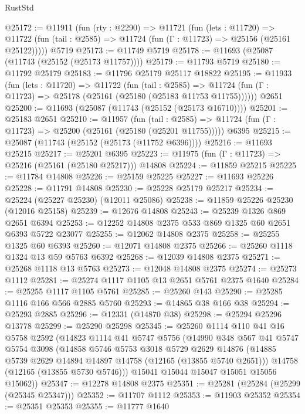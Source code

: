 \begin{lexlean}{RustStd}
\begin{coremodule}
@25172 := @11911
    (fun (rty : @2290) =>
    @11721
      (fun (lets : @11720) =>
      @11722 (fun (tail : @2585) => @11724 (fun (Γ : @11723) => @25156 (@25161 @25122)))))
    @5719
@25173 := @11749 @5719
@25178 := @11693 (@25087 (@11743 (@25152 (@25173 @11757))))
@25179 := @11793 @5719
@25180 := @11792 @25179
@25183 := @11796 @25179 @25117 @18822
@25195 := @11933
    (fun (lets : @11720) =>
    @11722
      (fun (tail : @2585) =>
      @11724 (fun (Γ : @11723) => @25178 (@25161 (@25180 (@25183 @11753 @11755))))))
    @2651
@25200 := @11693 (@25087 (@11743 (@25152 (@25173 @16710))))
@25201 := @25183 @2651
@25210 := @11957
    (fun (tail : @2585) => @11724 (fun (Γ : @11723) => @25200 (@25161 (@25180 (@25201 @11755)))))
    @6395
@25215 := @25087 (@11743 (@25152 (@25173 (@11752 @6396))))
@25216 := @11693 @25215
@25217 := @25201 @6395
@25223 := @11975 (fun (Γ : @11723) => @25216 (@25161 (@25180 @25217))) @14808
@25224 := @11859 @25215
@25225 := @11784 @14808
@25226 := @25159 @25225
@25227 := @11693 @25226
@25228 := @11791 @14808
@25230 := @25228 @25179 @25217
@25234 := @25224 (@25227 @25230) (@12011 @25086)
@25238 := @11859 @25226 @25230 (@12016 @25158)
@25239 := @12676 @14808
@25243 := @25239 @1326 @869 @2651 @6394
@25253 := @12252 @14808 @2375 @533 @869 @1325 @60 @2651 @6393 @5722 @23077
@25255 := @12062 @14808 @2375
@25258 := @25255 @1325 @60 @6393
@25260 := @12071 @14808 @2375
@25266 := @25260 @1118 @1324 @13 @59 @5763 @6392
@25268 := @12039 @14808 @2375
@25271 := @25268 @1118 @13 @5763
@25273 := @12048 @14808 @2375
@25274 := @25273 @1112
@25281 := @25274 @1117 @1105 @13 @2651 @5761 @2375 @1640
@25284 := @25255 @1117 @1105 @5761
@25285 := @25260 @143
@25290 := @25285 @1116 @166 @566 @2885 @5760
@25293 := @14865 @38 @166 @38
@25294 := @25293 @2885
@25296 := @12331 (@14870 @38)
@25298 := @25294 @25296 @13778
@25299 := @25290 @25298
@25345 := @25260
    @1114
    @110
    @41
    @16
    @5758
    @2592
    (@14823
      @1114
      @41
      @5747
      @5756
      (@14990
        @348
        @567
        @41
        @5747
        @5754
        @3098
        (@14858
          @5746
          @5753
          @3018
          @5729
          @2629
          @14876
          (@14885 @5739 @2629 @14894 @14897 @14758 (@12165 (@13855 @5740 @2651)))
          @14758
          (@12165 (@13855 @5730 @5746)))
        @15041
        @15044
        @15047
        @15051
        @15056
        @15062))
@25347 := @12278 @14808 @2375
@25351 := @25281 (@25284 (@25299 (@25345 @25347)))
@25352 := @11707 @1112
@25353 := @11903 @25352
@25354 := @25351 @25353
@25355 := @11777 @1640

\end{coremodule}
\end{lexlean}
